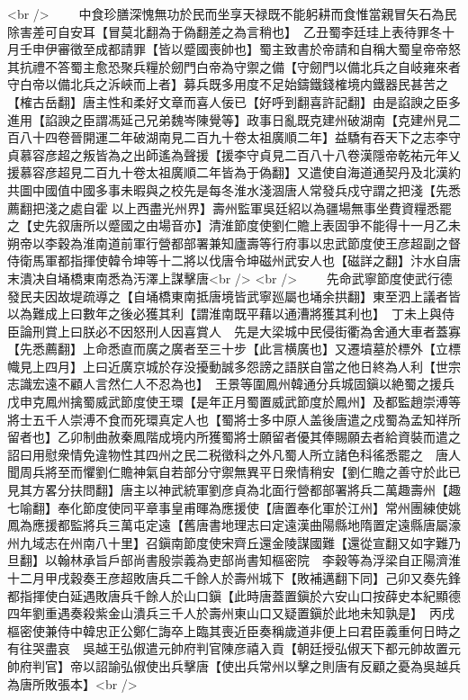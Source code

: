 <br />
　　中食珍膳深愧無功於民而坐享天禄既不能躬耕而食惟當親冒矢石為民除害差可自安耳【冒莫北翻為于偽翻差之為言稍也】　乙丑蜀李廷珪上表待罪冬十月壬申伊審徵至成都請罪【皆以蹙國喪帥也】蜀主致書於帝請和自稱大蜀皇帝帝怒其抗禮不答蜀主愈恐聚兵糧於劒門白帝為守禦之備【守劒門以備北兵之自岐雍來者守白帝以備北兵之泝峽而上者】募兵既多用度不足始鑄鐵錢榷境内鐵器民甚苦之【榷古岳翻】唐主性和柔好文章而喜人佞已【好呼到翻喜許記翻】由是諂諛之臣多進用【諂諛之臣謂馮延己兄弟魏岑陳覺等】政事日亂既克建州破湖南【克建州見二百八十四卷晉開運二年破湖南見二百九十卷太祖廣順二年】益驕有吞天下之志李守貞慕容彦超之叛皆為之出師遙為聲援【援李守貞見二百八十八卷漢隱帝乾祐元年乂援慕容彦超見二百九十卷太祖廣順二年皆為于偽翻】又遣使自海道通契丹及北漢約共圖中國值中國多事未暇與之校先是每冬淮水淺涸唐人常發兵戍守謂之把淺【先悉薦翻把淺之處自霍以上西盡光州界】壽州監軍吳廷紹以為疆場無事坐費資糧悉罷之【史先叙唐所以蹙國之由場音亦】清淮節度使劉仁贍上表固爭不能得十一月乙未朔帝以李穀為淮南道前軍行營都部署兼知廬壽等行府事以忠武節度使王彦超副之督侍衛馬軍都指揮使韓令坤等十二將以伐唐令坤磁州武安人也【磁詳之翻】汴水自唐末潰决自埇橋東南悉為汚澤上謀擊唐<br />
<br />
　　先命武寧節度使武行德發民夫因故堤疏導之【自埇橋東南抵唐境皆武寧廵屬也埇余拱翻】東至泗上議者皆以為難成上曰數年之後必獲其利【謂淮南既平藉以通漕將獲其利也】　丁未上與侍臣論刑賞上曰朕必不因怒刑人因喜賞人　先是大梁城中民侵街衢為舍通大車者蓋寡【先悉薦翻】上命悉直而廣之廣者至三十步【此言横廣也】又遷墳墓於標外【立標幟見上四月】上曰近廣京城於存没擾動誠多怨謗之語朕自當之他日終為人利【世宗志識宏遠不顧人言然仁人不忍為也】　王景等圍鳳州韓通分兵城固鎭以絶蜀之援兵戊申克鳳州擒蜀威武節度使王環【是年正月蜀置威武節度於鳳州】及都監趙崇溥等將士五千人崇溥不食而死環真定人也【蜀將士多中原人盖後唐遣之戍蜀為孟知祥所留者也】乙卯制曲赦秦鳳階成境内所獲蜀將士願留者優其俸賜願去者給資裝而遣之詔曰用慰衆情免違物性其四州之民二税徵科之外凡蜀人所立諸色科徭悉罷之　唐人聞周兵將至而懼劉仁贍神氣自若部分守禦無異平日衆情稍安【劉仁贍之善守於此已見其方畧分扶問翻】唐主以神武統軍劉彦貞為北面行營都部署將兵二萬趣壽州【趣七喻翻】奉化節度使同平章事皇甫暉為應援使【唐置奉化軍於江州】常州團練使姚鳳為應援都監將兵三萬屯定遠【舊唐書地理志曰定遠漢曲陽縣地隋置定遠縣唐屬濠州九域志在州南八十里】召鎭南節度使宋齊丘還金陵謀國難【還從宣翻又如字難乃旦翻】以翰林承旨戶部尚書殷崇義為吏部尚書知樞密院　李穀等為浮梁自正陽濟淮十二月甲戌穀奏王彦超敗唐兵二千餘人於壽州城下【敗補邁翻下同】己卯又奏先鋒都指揮使白延遇敗唐兵千餘人於山口鎭【此時唐蓋置鎭於六安山口按薛史本紀顯德四年劉重遇奏殺紫金山潰兵三千人於壽州東山口又疑置鎭於此地未知孰是】　丙戌樞密使兼侍中韓忠正公鄭仁誨卒上臨其喪近臣奏稱歲道非便上曰君臣義重何日時之有往哭盡哀　吳越王弘俶遣元帥府判官陳彦禧入貢【朝廷授弘俶天下都元帥故置元帥府判官】帝以詔諭弘俶使出兵擊唐【使出兵常州以擊之則唐有反顧之憂為吳越兵為唐所敗張本】<br />
